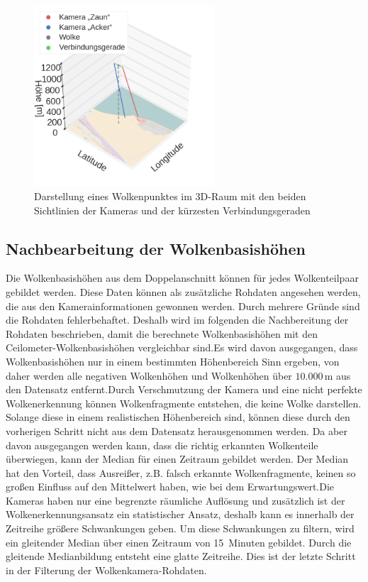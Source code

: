 \documentclass[a4paper,11pt,twoside,german]{article}
\newcommand{\absatz}{\smallbreak}
\begin{document}
\begin{figure}[h]
	\begin{center}
		\includegraphics[width=0.6\textwidth]{media/3d.png}
		\caption[Darstellung des Doppelanschnitts]{Darstellung eines Wolkenpunktes im 3D-Raum mit den beiden Sichtlinien der Kameras und der kürzesten Verbindungsgeraden \footnotemark}
		\label{FIGDoppel3d}
	\end{center}
\end{figure}

\subsection{Nachbearbeitung der Wolkenbasishöhen}
\label{SECHeightPost}

Die Wolkenbasishöhen aus dem Doppelanschnitt können für jedes Wolkenteilpaar
gebildet werden. Diese Daten können als zusätzliche Rohdaten angesehen werden,
die aus den Kamerainformationen gewonnen werden. Durch mehrere Gründe sind die
Rohdaten fehlerbehaftet. Deshalb wird im folgenden die Nachbereitung der
Rohdaten beschrieben, damit die berechnete Wolkenbasishöhen mit den
Ceilometer-Wolkenbasishöhen vergleichbar sind.\absatz Es
wird davon ausgegangen, dass Wolkenbasishöhen nur in einem bestimmten
Höhenbereich Sinn ergeben, von daher werden alle negativen Wolkenhöhen und
Wolkenhöhen über $10.000\,\mathrm{m}$ aus den Datensatz entfernt.\absatz Durch
Verschmutzung der Kamera und eine nicht perfekte Wolkenerkennung können
Wolkenfragmente entstehen, die keine Wolke darstellen.  Solange diese in einem
realistischen Höhenbereich sind, können diese durch den vorherigen Schritt nicht
aus dem Datensatz herausgenommen werden. Da aber davon ausgegangen werden kann,
dass die richtig erkannten Wolkenteile überwiegen, kann der Median für einen
Zeitraum gebildet werden. Der Median hat den Vorteil, dass Ausreißer, z.B.
falsch erkannte Wolkenfragmente, keinen so großen Einfluss auf den Mittelwert
haben, wie bei dem Erwartungswert.\absatz Die Kameras haben nur eine begrenzte
räumliche Auflösung und zusätzlich ist der Wol\-ken\-er\-ken\-nungs\-an\-satz
ein statistischer Ansatz, deshalb kann es innerhalb der Zeitreihe größere
Schwankungen geben. Um diese Schwankungen zu filtern, wird ein gleitender Median
über einen Zeitraum von 15~Minuten gebildet. Durch die gleitende Medianbildung
entsteht eine glatte Zeitreihe. Dies ist der letzte Schritt in der Filterung der
Wolkenkamera-Rohdaten.\absatz
\end{document}
